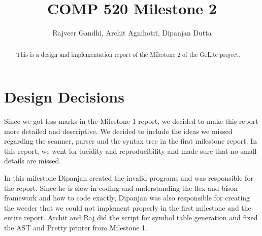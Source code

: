 \documentclass[preprint,12pt]{elsarticle}
\begin{document}
\begin{frontmatter}


\title{COMP 520 Milestone 2}




\author{Rajveer Gandhi, Archit Agnihotri, Dipanjan Dutta}

\begin{abstract}
This is a design and implementation report of the Milestone 2 of the GoLite project.
\end{abstract}

\end{frontmatter}


\section{Design Decisions}

Since we got less marks in the Milestone 1 report, we decided to make this report more detailed and descriptive. We decided to include the ideas we missed regarding the scanner, parser and the syntax tree in the first milestone report. In this report, we went for lucidity and reproducibility and made sure that no small details are missed.

In this milestone Dipanjan created the invalid programs and was responsible for the report. Since he is slow in coding and understanding the flex and bison framework and how to code exactly, Dipanjan was also responsible for creating the weeder that we could not implement properly in the first milestone and the entire report. Archit and Raj did the script for symbol table generation and fixed the AST and Pretty printer from Milestone 1. 
\end{document}

